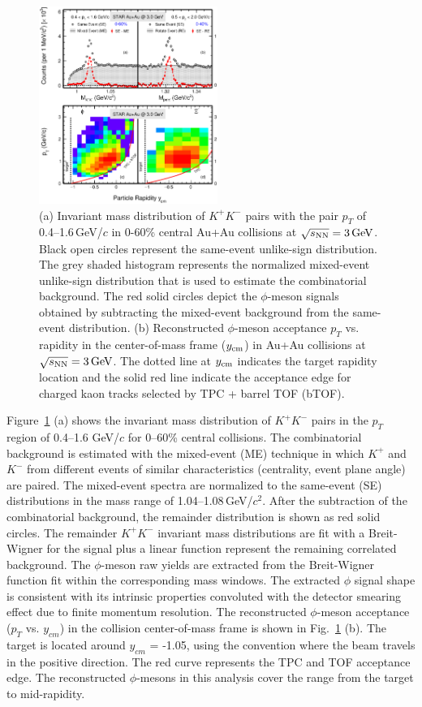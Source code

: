 \documentclass[%
 reprint,	
showpacs,
 amsmath,amssymb,
 aps,
 prc,
]{revtex4-1}
\begin{document}
\begin{figure}
\centering
\hspace*{-4mm}
\includegraphics[width=0.52\textwidth]{fig/fig1_signal.eps}
  \caption{(a) Invariant mass distribution of $K^+K^-$ pairs with the pair $p_T$ of 0.4--1.6\,GeV/$c$ in 0-60\% central Au+Au collisions at ${\sqrt{s_{\rm NN}} = \rm{3\,GeV}}$. Black open circles represent the same-event unlike-sign distribution. The grey shaded histogram represents the normalized mixed-event unlike-sign distribution that is used to estimate the combinatorial background. The red solid circles depict the $\phi$-meson signals obtained by subtracting the mixed-event background from the same-event distribution. (b) Reconstructed $\phi$-meson acceptance $p_T$ vs. rapidity in the center-of-mass frame ($y_{\rm cm}$) in Au+Au collisions at ${\sqrt{s_{\rm NN}} = \rm{3\,GeV}}$. The dotted line at $y_{\rm cm}$ indicates the target rapidity location and the solid red line indicate the acceptance edge for charged kaon tracks selected by TPC + barrel TOF (bTOF).}
\label{fig:phiSignal} 
\end{figure}


Figure~\ref{fig:phiSignal} (a) shows the invariant mass distribution of $K^+K^-$ pairs in the $p_{T}$ region of 0.4--1.6 GeV/$c$ for 0--60\% central collisions. The combinatorial background is estimated with the mixed-event (ME) technique in which $K^+$ and $K^-$ from different events of similar characteristics (centrality, event plane angle) are paired. The mixed-event spectra are normalized to the same-event (SE) distributions in the mass range of 1.04--1.08\,GeV/$c^2$. After the subtraction of the combinatorial background, the remainder distribution is shown as red solid circles. The remainder $K^+K^-$ invariant mass distributions are fit with a Breit-Wigner for the signal plus a linear function represent the remaining correlated background. The $\phi$-meson raw yields are extracted from the Breit-Wigner function fit within the corresponding mass windows. The extracted $\phi$ signal shape is consistent with its intrinsic properties convoluted with the detector smearing effect due to finite momentum resolution. The reconstructed $\phi$-meson acceptance ($p_T$ vs. $y_{cm}$) in the collision center-of-mass frame is shown in Fig.~\ref{fig:phiSignal} (b). The target is located around $y_{cm}$ = -1.05, using the convention where the beam travels in the positive direction. The red curve represents the TPC and TOF acceptance edge. The reconstructed $\phi$-mesons in this analysis cover the range from the target to mid-rapidity.
\end{document}
